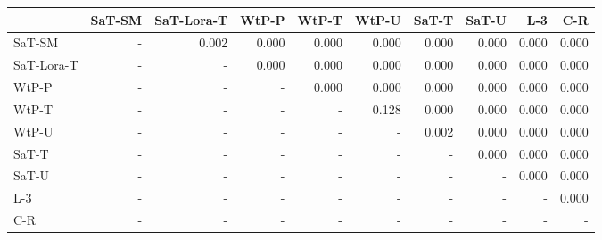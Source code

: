 \begin{tabular}{lrrrrrrrrr}
\toprule
 & SaT-SM & SaT-Lora-T & WtP-P & WtP-T & WtP-U & SaT-T & SaT-U & L-3 & C-R \\
\midrule
SaT-SM & - & 0.002 & 0.000 & 0.000 & 0.000 & 0.000 & 0.000 & 0.000 & 0.000 \\
SaT-Lora-T & - & - & 0.000 & 0.000 & 0.000 & 0.000 & 0.000 & 0.000 & 0.000 \\
WtP-P & - & - & - & 0.000 & 0.000 & 0.000 & 0.000 & 0.000 & 0.000 \\
WtP-T & - & - & - & - & 0.128 & 0.000 & 0.000 & 0.000 & 0.000 \\
WtP-U & - & - & - & - & - & 0.002 & 0.000 & 0.000 & 0.000 \\
SaT-T & - & - & - & - & - & - & 0.000 & 0.000 & 0.000 \\
SaT-U & - & - & - & - & - & - & - & 0.000 & 0.000 \\
L-3 & - & - & - & - & - & - & - & - & 0.000 \\
C-R & - & - & - & - & - & - & - & - & - \\
\bottomrule
\end{tabular}

